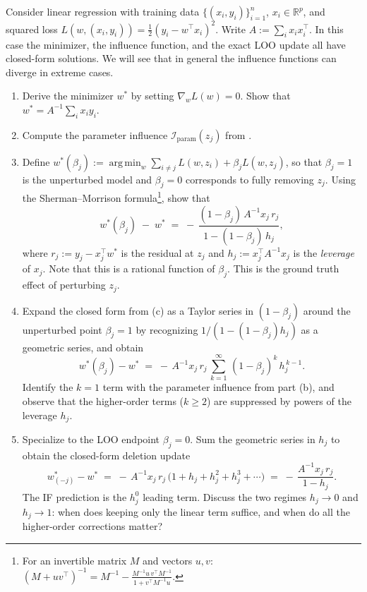 \documentclass[11pt]{article}
\DeclareMathOperator*{\argmin}{arg\,min}
\begin{document}
\begin{exercise}\label{ex:ols-if}
Consider linear regression with training data $\{(x_i,y_i)\}_{i=1}^n$, $x_i\in\mathbb{R}^p$, and squared loss $L(w,(x_i,y_i)) = \tfrac12(y_i - w^\top x_i)^2$. Write $A := \sum_i x_i x_i^\top$. In this case the minimizer, the influence function, and the exact LOO update all have closed-form solutions. We will see that in general the influence functions can diverge in extreme cases.
\begin{enumerate}
  \item Derive the minimizer $w^*$ by setting $\nabla_w L(w) = 0$. Show that $w^* = A^{-1}\sum_i x_i y_i$.
  \item Compute the parameter influence $\mathcal{I}_{\mathrm{param}}(z_j)$ from .
  \item Define $w^*(\beta_j) := \argmin_w \sum_{i\ne j} L(w,z_i) + \beta_j L(w,z_j)$, so that $\beta_j = 1$ is the unperturbed model and $\beta_j = 0$ corresponds to fully removing $z_j$. Using the Sherman--Morrison formula\footnote{For an invertible matrix $M$ and vectors $u,v$: $(M + uv^\top)^{-1} = M^{-1} - \frac{M^{-1}u\,v^\top M^{-1}}{1 + v^\top M^{-1}u}$.}, show that
  \[
    w^*(\beta_j) \;-\; w^* \;=\; -\,\frac{(1-\beta_j)\,A^{-1} x_j\,r_j}{1 - (1-\beta_j)\,h_j},
  \]
  where $r_j := y_j - x_j^\top w^*$ is the residual at $z_j$ and $h_j := x_j^\top A^{-1} x_j$ is the \emph{leverage} of $x_j$. Note that this is a rational function of $\beta_j$. This is the ground truth effect of perturbing $z_j$.
  \item Expand the closed form from (c) as a Taylor series in $(1-\beta_j)$ around the unperturbed point $\beta_j = 1$ by recognizing $1/(1 - (1-\beta_j)h_j)$ as a geometric series, and obtain
  \[
    w^*(\beta_j) - w^* \;=\; -\,A^{-1} x_j\,r_j\,\sum_{k=1}^{\infty}\,(1-\beta_j)^k\,h_j^{\,k-1}.
  \]
  Identify the $k=1$ term with the parameter influence from part (b), and observe that the higher-order terms ($k \ge 2$) are suppressed by powers of the leverage $h_j$.
  \item Specialize to the LOO endpoint $\beta_j = 0$. Sum the geometric series in $h_j$ to obtain the closed-form deletion update
  \[
    w^*_{(-j)} - w^* \;=\; -\,A^{-1} x_j\,r_j\,\bigl(1 + h_j + h_j^{2} + h_j^{3} + \cdots\bigr) \;=\; -\,\frac{A^{-1} x_j\,r_j}{1 - h_j}.
  \]
  The IF prediction is the $h_j^0$ leading term. Discuss the two regimes $h_j \to 0$ and $h_j \to 1$: when does keeping only the linear term suffice, and when do all the higher-order corrections matter?
\end{enumerate}
\end{exercise}
\end{document}
